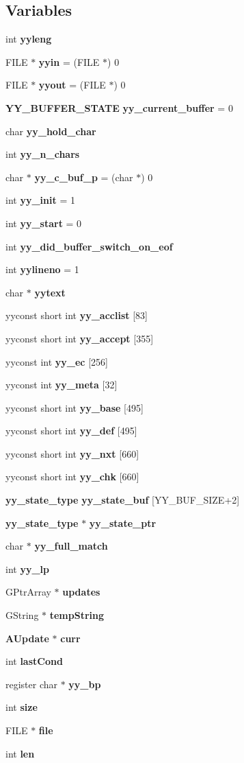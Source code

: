 \subsection*{Variables}
\begin{CompactItemize}
\item 
int {\bf yyleng}
\item 
FILE $\ast$ {\bf yyin} = (FILE $\ast$) 0
\item 
FILE $\ast$ {\bf yyout} = (FILE $\ast$) 0
\item 
{\bf YY\_\-BUFFER\_\-STATE} {\bf yy\_\-current\_\-buffer} = 0
\item 
char {\bf yy\_\-hold\_\-char}
\item 
int {\bf yy\_\-n\_\-chars}
\item 
char $\ast$ {\bf yy\_\-c\_\-buf\_\-p} = (char $\ast$) 0
\item 
int {\bf yy\_\-init} = 1
\item 
int {\bf yy\_\-start} = 0
\item 
int {\bf yy\_\-did\_\-buffer\_\-switch\_\-on\_\-eof}
\item 
int {\bf yylineno} = 1
\item 
char $\ast$ {\bf yytext}
\item 
yyconst short int {\bf yy\_\-acclist} [83]
\item 
yyconst short int {\bf yy\_\-accept} [355]
\item 
yyconst int {\bf yy\_\-ec} [256]
\item 
yyconst int {\bf yy\_\-meta} [32]
\item 
yyconst short int {\bf yy\_\-base} [495]
\item 
yyconst short int {\bf yy\_\-def} [495]
\item 
yyconst short int {\bf yy\_\-nxt} [660]
\item 
yyconst short int {\bf yy\_\-chk} [660]
\item 
{\bf yy\_\-state\_\-type} {\bf yy\_\-state\_\-buf} [YY\_\-BUF\_\-SIZE+2]
\item 
{\bf yy\_\-state\_\-type} $\ast$ {\bf yy\_\-state\_\-ptr}
\item 
char $\ast$ {\bf yy\_\-full\_\-match}
\item 
int {\bf yy\_\-lp}
\item 
GPtr\-Array $\ast$ {\bf updates}
\item 
GString $\ast$ {\bf temp\-String}
\item 
{\bf AUpdate} $\ast$ {\bf curr}
\item 
int {\bf last\-Cond}
\item 
register char $\ast$ {\bf yy\_\-bp}
\item 
int {\bf size}
\item 
FILE $\ast$ {\bf file}
\item 
int {\bf len}
\end{CompactItemize}


